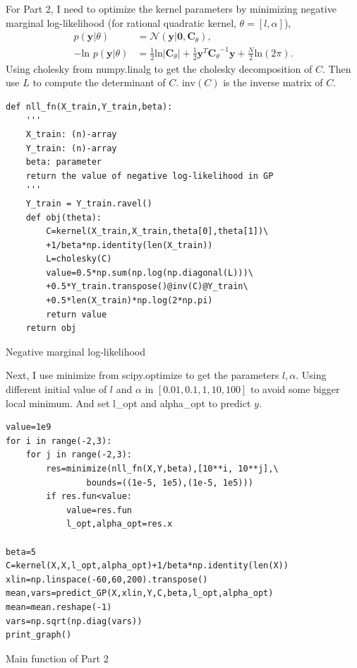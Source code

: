 \documentclass{article}
\begin{document}
For Part 2, I need to optimize the kernel parameters by minimizing negative marginal log-likelihood (for rational quadratic kernel, $\theta=[l,\alpha]$),
\begin{align*}
p(\mathbf{y}| \theta)&=\mathcal{N}(\mathbf{y}|\mathbf{0}, \mathbf{C}_\theta),\\
-\mbox{ln }p(\mathbf{y}| \theta)&= \frac{1}{2}\mbox{ln}| \mathbf{C}_\theta | + \frac{1}{2}\mathbf{y}^T {\mathbf{C}_\theta}^{-1}\mathbf{y} + \frac{N}{2} \mbox{ln} (2\pi).
\end{align*}
Using cholesky from numpy.linalg to get the cholesky decomposition of $C$. Then use $L$ to compute the determinant of $C$. $\mbox{inv}(C)$ is the inverse matrix of $C$.
\begin{listing}[!ht]
\begin{verbatim}
def nll_fn(X_train,Y_train,beta):
    '''
    X_train: (n)-array
    Y_train: (n)-array
    beta: parameter
    return the value of negative log-likelihood in GP
    '''
    Y_train = Y_train.ravel()
    def obj(theta):  
        C=kernel(X_train,X_train,theta[0],theta[1])\
        +1/beta*np.identity(len(X_train))
        L=cholesky(C)
        value=0.5*np.sum(np.log(np.diagonal(L)))\
        +0.5*Y_train.transpose()@inv(C)@Y_train\
        +0.5*len(X_train)*np.log(2*np.pi)
        return value
    return obj
\end{verbatim}
\caption{Negative marginal log-likelihood}
\label{listing}
\end{listing}

Next, I use minimize from scipy.optimize to get the parameters $l,\alpha$. Using different initial value of $l$ and $\alpha$ in $[0.01,0.1,1,10,100]$ to avoid some bigger local minimum. And set l\_opt and alpha\_opt to predict $y$.
\begin{listing}[!ht]
\begin{verbatim}
value=1e9
for i in range(-2,3):
    for j in range(-2,3):
        res=minimize(nll_fn(X,Y,beta),[10**i, 10**j],\
                bounds=((1e-5, 1e5),(1e-5, 1e5)))
        if res.fun<value:
            value=res.fun
            l_opt,alpha_opt=res.x
            
beta=5
C=kernel(X,X,l_opt,alpha_opt)+1/beta*np.identity(len(X))
xlin=np.linspace(-60,60,200).transpose()
mean,vars=predict_GP(X,xlin,Y,C,beta,l_opt,alpha_opt)
mean=mean.reshape(-1)
vars=np.sqrt(np.diag(vars))
print_graph()
\end{verbatim}
\caption{Main function of Part 2}
\label{listing}
\end{listing}
\end{document}
